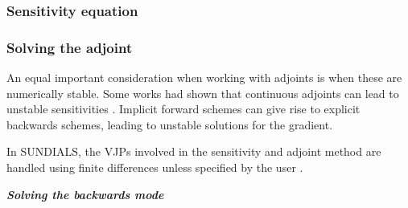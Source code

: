 \subsubsection{Sensitivity equation}

\subsubsection{Solving the adjoint}

An equal important consideration when working with adjoints is when these are numerically stable. 
Some works had shown that continuous adjoints can lead to unstable sensitivities \cite{Jensen_Nakshatrala_Tortorelli_2014}.
Implicit forward schemes can give rise to explicit backwards schemes, leading to unstable solutions for the gradient. 

In SUNDIALS, the VJPs involved in the sensitivity and adjoint method are handled using finite differences unless specified by the user \cite{SUNDIALS-hindmarsh2005sundials}.

\vspace*{10px}
\noindent \textbf{\textit{Solving the backwards mode}}
\vspace*{5px}

